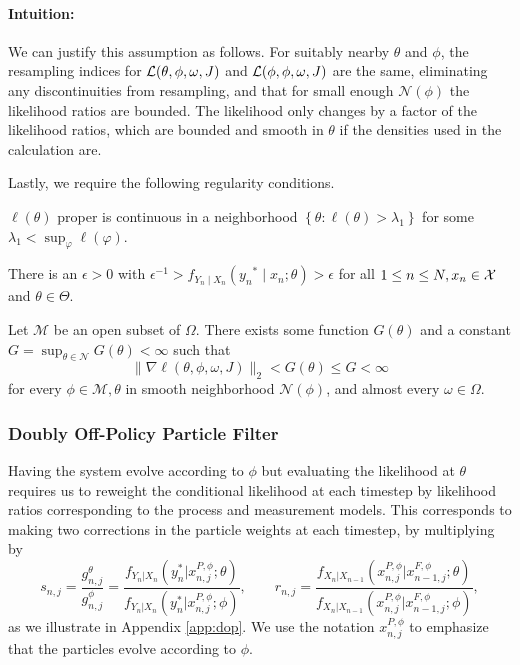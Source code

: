 \documentclass{article}
\begin{document}
\paragraph{Intuition:} We can justify this assumption as follows. For suitably nearby $\theta$ and $\phi$, the resampling indices for $\mathcal{L}(\theta,\phi,\omega, J)$ and $\mathcal{L}(\phi,\phi,\omega, J)$ are the same, eliminating any discontinuities from resampling, and that for small enough $\mathcal{N}(\phi)$ the likelihood ratios are bounded. The likelihood only changes by a factor of the likelihood ratios, which are bounded and smooth in $\theta$ if the densities used in the calculation are. 

Lastly, we require the following regularity conditions.

\begin{aspt} $\ell(\theta)$ proper is continuous in a neighborhood $\left\{\theta: \ell(\theta)>\lambda_1\right\}$ for some $\lambda_1<\sup _{\varphi} \ell(\varphi)$.
\end{aspt}

\begin{aspt} There is an $\epsilon>0$ with $\epsilon^{-1}>f_{Y_n \mid X_n}\left(y_n{ }^* \mid x_n; \theta\right)>\epsilon$ for all $1 \leq n \leq N, x_n \in {\mathcal{X}}$ and $\theta \in \Theta.$
\end{aspt}

\begin{aspt}
\label{assump:local-bounded-derivative}
Let $\mathcal{M}$ be an open subset of $\Omega$. There exists some function $G(\theta)$ and a constant $G=\sup _{\theta \in \mathcal{N}} G(\theta)<\infty$ such that
    $$
    \|\nabla \ell(\theta, \phi, \omega, J)\|_2<G(\theta) \leq G<\infty
    $$
    for every $\phi \in \mathcal{M}, \theta$ in smooth neighborhood $\mathcal{N}(\phi)$, and almost every $\omega \in \Omega$.
\end{aspt}

\subsubsection{Doubly Off-Policy Particle Filter}

Having the system evolve according to $\phi$ but evaluating the likelihood at $\theta$ requires us to reweight the conditional likelihood at each timestep by likelihood ratios corresponding to the process and measurement models. This corresponds to making two corrections in the particle weights at each timestep, by multiplying by 
\begin{equation}
    s_{n,j}=\frac{g_{n,j}^\theta}{g_{n,j}^{\phi}}=\frac{f_{Y_n|X_n}(y_n^*|x_{n,j}^{P, \phi}; \theta)}{f_{Y_n|X_n}(y_n^*|x_{n,j}^{P,\phi}; \phi)}, \qquad r_{n,j}=\frac{f_{X_n|X_{n-1}}(x_{n,j}^{P, \phi}|x_{n-1,j}^{F, \phi}; \theta)}{f_{X_n|X_{n-1}}(x_{n,j}^{P, \phi}|x_{n-1,j}^{F, \phi}; \phi)},
\end{equation}
as we illustrate in Appendix \ref{app:dop}. We use the notation $x_{n,j}^{P, \phi}$ to emphasize that the particles evolve according to $\phi$. 
\end{document}

